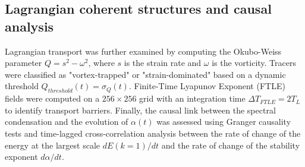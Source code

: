 \documentclass[]{article}
\begin{document}
\subsection{Lagrangian coherent structures and causal analysis}
Lagrangian transport was further examined by computing the Okubo-Weiss parameter $Q = s^2 - \omega^2$, where $s$ is the strain rate and $\omega$ is the vorticity. Tracers were classified as "vortex-trapped" or "strain-dominated" based on a dynamic threshold $Q_{threshold}(t) = \sigma_Q(t)$. Finite-Time Lyapunov Exponent (FTLE) fields were computed on a $256 \times 256$ grid with an integration time $\Delta T_{FTLE} = 2 T_L$ to identify transport barriers. Finally, the causal link between the spectral condensation and the evolution of $\alpha(t)$ was assessed using Granger causality tests and time-lagged cross-correlation analysis between the rate of change of the energy at the largest scale $dE(k=1)/dt$ and the rate of change of the stability exponent $d\alpha/dt$.
\end{document}
